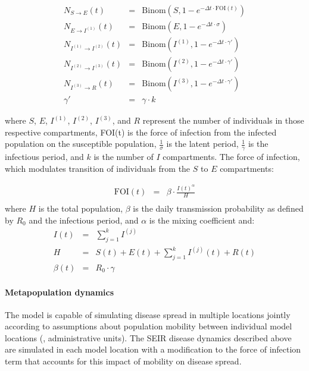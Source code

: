 {\begin{eqnarray}
N_{S \to E} (t) &=& \text{Binom}\left(S, 1 - e^{- \Delta t \cdot \text{FOI}(t)}\right) \\
N_{E \to I^{( 1)}} (t) &=& \text{Binom}\left(E, 1 - e^{- \Delta t \cdot \sigma} \right) \\
N_{I^{( 1 )} \to I^{( 2)}} (t) &=& \text{Binom}\left(I^{( 1)}, 1 - e^{- \Delta t \cdot \gamma'} \right) \\
N_{I^{(2)} \to I^{(3)}} (t) &=& \text{Binom}\left(I^{(2)}, 1 - e^{- \Delta t \cdot \gamma' } \right) \\
N_{I^{(3)} \to R} (t) &=& \text{Binom}\left(I^{(3)}, 1 - e^{- \Delta t \cdot \gamma' } \right) \\
\gamma' &=& \gamma \cdot k
\end{eqnarray}

where $S$, $E$, $I^{\left(1\right)}$, $I^{\left(2\right)}$, $I^{\left(3\right)}$, and $R$ represent the number of individuals in those respective compartments, FOI(t) is the force of infection from the infected population on the susceptible population, $\frac{1}{\sigma}$ is the latent period, $\frac{1}{\gamma}$ is the infectious period, and $k$ is the number of $I$ compartments. The force of infection, which modulates transition of individuals from the $S$ to $E$ compartments:

\begin{eqnarray}
\text{FOI}(t) &=&\beta \cdot \frac{I{(t)}^{\alpha}}{H} \\
\end{eqnarray}
where $H$ is the total population, $\beta$ is the daily transmission probability as defined by $R_0$ and the infectious period, and $\alpha$ is the mixing coefficient and:
\begin{eqnarray}
I(t) &=& \sum\limits_{{j = 1}}^{k} I^{( j)} \\
H &=& S(t)+E(t)+\sum_{j=1}^{k} I^{\left(j\right)}(t)+R(t) \\
\beta(t) &=& R_{0}\cdot\gamma
\end{eqnarray}

\paragraph{Metapopulation dynamics}
The model is capable of simulating disease spread in multiple locations jointly according to assumptions about population mobility between individual model locations (\eg, administrative units). The SEIR disease dynamics described above are simulated in each model location with a modification to the force of infection term that accounts for this impact of mobility on disease spread.

}
